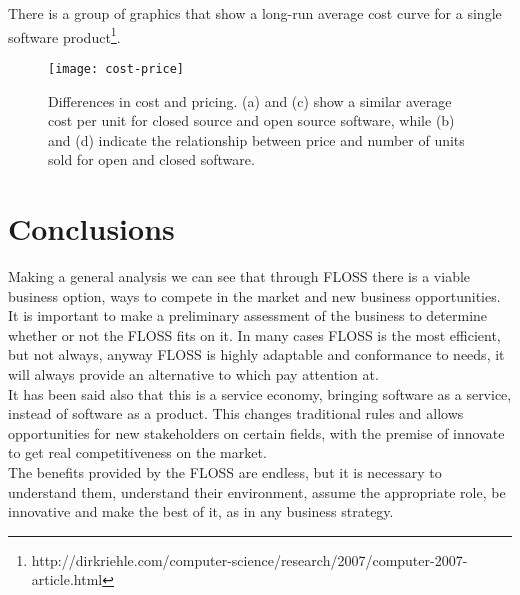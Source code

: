 There is a group of graphics that show a long-run average cost curve for a single software product\footnote{http://dirkriehle.com/computer-science/research/2007/computer-2007-article.html}.

\begin{figure}[h]
\begin{center}
\texttt{[image: cost-price]}
\caption{Differences in cost and pricing. (a) and (c) show a similar average cost per unit for closed source and open source software, while (b) and (d) indicate the relationship between price and number of units sold for open and closed software.}
\label{fig:cost-price}
\end{center}
\end{figure}

\section{Conclusions}\label{Conclusions Chapter 2}

Making a general analysis we can see that through FLOSS there is a viable business option, ways to compete in the market and new business opportunities. It is important to make a preliminary assessment of the business to determine whether or not the FLOSS fits on it. In many cases FLOSS is the most efficient, but not always, anyway FLOSS is highly adaptable and conformance to needs, it will always provide an alternative to which pay attention at.\\

It has been said also that this is a service economy, bringing software as a service, instead of software as a product. This changes traditional rules and allows opportunities for new stakeholders on certain fields, with the premise of innovate to get real competitiveness on the market.\\

The benefits provided by the FLOSS are endless, but it is necessary to understand them, understand their environment, assume the appropriate role, be innovative and make the best of it, as in any business strategy.
